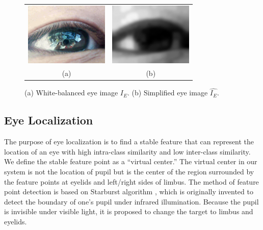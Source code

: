\documentclass[sigconf]{acmart}
\begin{document}
\begin{figure}
\centering
\begin{tabular}{cc}
\includegraphics[width=4cm]{../Figures/visible_eye.png} &
\includegraphics[width=4cm]{../Figures/simplified.png} \\
(a) & (b)
\end{tabular}
\caption{(a) White-balanced eye image $I_E$. (b) Simplified eye image $\hat{I_E}$.}
\label{fig:preprocessing}
\end{figure}


\subsection{Eye Localization}

The purpose of eye localization is to find a stable feature that can represent the location of an eye
with high intra-class similarity and low inter-class similarity.
We define the stable feature point as a ``virtual center.''
The virtual center in our system is not the location of pupil
but is the center of the region surrounded by the feature points at eyelids and left/right sides of limbus.
The method of feature point detection is based on Starburst algorithm \cite{Li:2005:SHA:1099539.1099986},
which is originally invented to detect the boundary of one's pupil under infrared illumination.
Because the pupil is invisible under visible light, it is proposed to change the target to limbus and eyelids.
\end{document}
